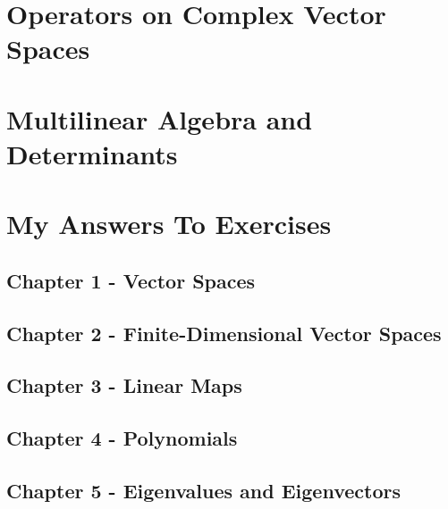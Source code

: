 \documentclass[12pt]{article}
\theoremstyle{definition}
\theoremstyle{plain}
\theoremstyle{remark}
\begin{document}
\section{Operators on Complex Vector Spaces}



\section{Multilinear Algebra and Determinants}



\newpage

\section*{My Answers To Exercises}

\subsection*{Chapter 1 - Vector Spaces}


\subsection*{Chapter 2 - Finite-Dimensional Vector Spaces}


\subsection*{Chapter 3 - Linear Maps}


\subsection*{Chapter 4 - Polynomials}


\subsection*{Chapter 5 - Eigenvalues and Eigenvectors}

\end{document}

